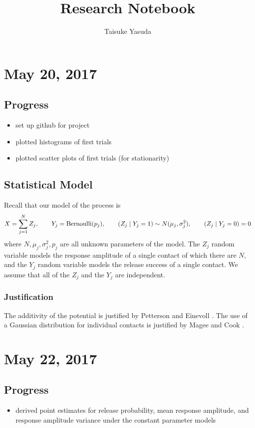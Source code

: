 \documentclass{article}
\title{Research Notebook}
\author{Taisuke Yasuda}
\begin{document}
\maketitle
\tableofcontents
\newpage

\section{May 20, 2017}
\subsection{Progress}
\begin{itemize}
  \item set up github for project
  \item plotted histograms of first trials
  \item plotted scatter plots of first trials (for stationarity)
\end{itemize}

\subsection{Statistical Model}
Recall that our model of the process is
\[
  X = \sum_{j=1}^N Z_j,\qquad Y_j = \operatorname{Bernoulli}(p_j),\qquad (Z_j\mid Y_j = 1)\sim N(\mu_j,\sigma_j^2), \qquad (Z_j\mid Y_j = 0) = 0
\]
where $N, \mu_j, \sigma_j^2, p_j$ are all unknown parameters of the model. The $Z_j$ random variable models the response amplitude of a single contact of which there are $N$, and the $Y_j$ random variable models the release success of a single contact. We assume that all of the $Z_j$ and the $Y_j$ are independent.

\subsubsection{Justification}
The additivity of the potential is justified by Petterson and Einevoll \cite{pettersen2008amplitude}. The use of a Gaussian distribution for individual contacts is justified by Magee and Cook \cite{magee2000somatic}.

\section{May 22, 2017}
\subsection{Progress}
\begin{itemize}
  \item derived point estimates for release probability, mean response amplitude, and response amplitude variance under the constant parameter models
\end{itemize}
\end{document}
